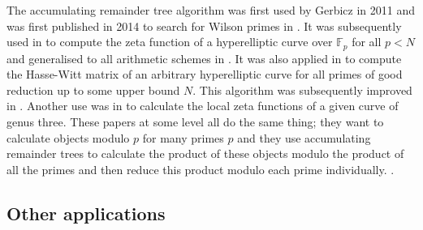 The accumulating remainder tree algorithm was first used by Gerbicz in 2011 and was first published in 2014 to search for Wilson primes in \cite{CGH14}. It was subsequently used in  \cite{Har14} to compute the zeta function of a hyperelliptic curve over $\mathbb{F}_p$ for all $p<N$ and generalised to all arithmetic schemes in \cite{Har15}. It was also applied in \cite{HS14} to compute the Hasse-Witt matrix of an arbitrary hyperelliptic curve for all primes of good reduction up to some upper bound $N$. This algorithm was subsequently improved in \cite{HS16}. Another use was in \cite{HMS16} to calculate the local zeta functions of a given curve of genus three. These papers at some level all do the same thing; they want to calculate objects modulo $p$ for many primes $p$ and they use accumulating remainder trees to calculate the product of these objects modulo the product of all the primes and then reduce this product modulo each prime individually. . 


\subsection{Other applications}
